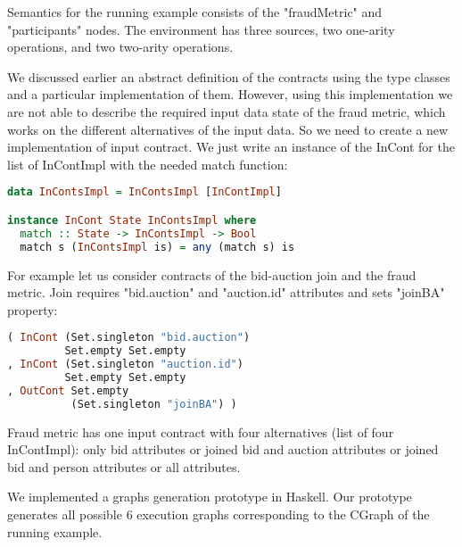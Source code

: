 Semantics for the running example consists of the "fraudMetric" and "participants" nodes.
The environment has three sources, two one-arity operations, and two two-arity operations.

We discussed earlier an abstract definition of the contracts using the type classes and a particular implementation of them. 
However, using this implementation we are not able to describe the required input data state of the fraud metric, which works on the different alternatives of the input data.
So we need to create a new implementation of input contract.
We just write an instance of the InCont for the list of InContImpl with the needed match function:

\begin{lstlisting}[language=Haskell]
data InContsImpl = InContsImpl [InContImpl]

instance InCont State InContsImpl where
  match :: State -> InContsImpl -> Bool
  match s (InContsImpl is) = any (match s) is
\end{lstlisting}

For example let us consider contracts of the bid-auction join and the fraud metric.
Join requires "bid.auction" and "auction.id" attributes and sets "joinBA" property:
\begin{lstlisting}[language=Haskell]
( InCont (Set.singleton "bid.auction")
         Set.empty Set.empty
, InCont (Set.singleton "auction.id")
         Set.empty Set.empty
, OutCont Set.empty
          (Set.singleton "joinBA") )
\end{lstlisting}

Fraud metric has one input contract with four alternatives (list of four InContImpl):
only bid attributes
or joined bid and auction attributes
or joined bid and person attributes
or all attributes.

We implemented a graphs generation prototype in Haskell.
Our prototype generates all possible 6 execution graphs corresponding to the CGraph of the running example.
